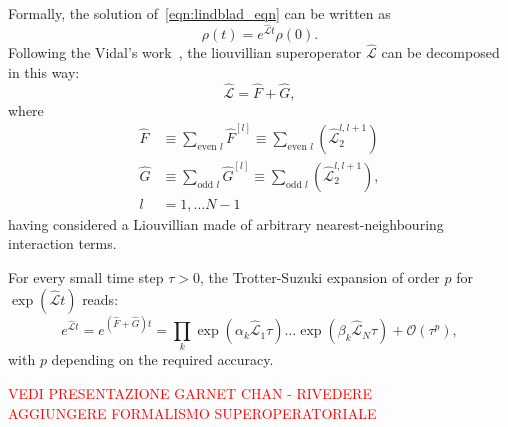 Formally, the solution of~\ref{eqn:lindblad_eqn} can be written as
\begin{equation}
\label{eqn:lindblad_dinamics}
    \rho(t) = e^{\hat{\mathcal{L}}t}\rho(0).
\end{equation}
Following the Vidal's work~\cite{PhysRevLett.93.040502}, the liouvillian superoperator $\hat{\mathcal{L}}$ can be decomposed in this way:
\begin{equation}
    \hat{\mathcal{L}} = \hat{F} + \hat{G},
\end{equation}
where
\begin{equation}
    \begin{split}
        \hat{F} &\equiv \sum_{\text{even } l} \hat{F}^{[l]} \equiv \sum_{\text{even } l} (\hat{\mathcal{L}}_2^{l, l+1}) \\
        \hat{G} &\equiv \sum_{\text{odd } l} \hat{G}^{[l]} \equiv \sum_{\text{odd } l} (\hat{\mathcal{L}}_2^{l, l+1}), \\
        l  &= 1, \dots N-1
    \end{split}
\end{equation}
having considered a Liouvillian made of arbitrary nearest-neighbouring interaction terms.

For every small time step $\tau > 0$, the Trotter-Suzuki expansion of order $p$ for $\exp{(\hat{\mathcal{L}} t)}$ reads:
\begin{equation*}
    e^{\hat{\mathcal{L}}t} = e^{(\hat{F}+ \hat{G})t} = \prod_k \exp{(\alpha_k\hat{\mathcal{L}}_1\tau)}\dots\exp{(\beta_k\hat{\mathcal{L}}_N\tau)} + \mathcal{O}(\tau^p),
\end{equation*}
with $p$ depending on the required accuracy.

\textcolor{red}{VEDI PRESENTAZIONE GARNET CHAN - RIVEDERE \\ AGGIUNGERE FORMALISMO SUPEROPERATORIALE}



